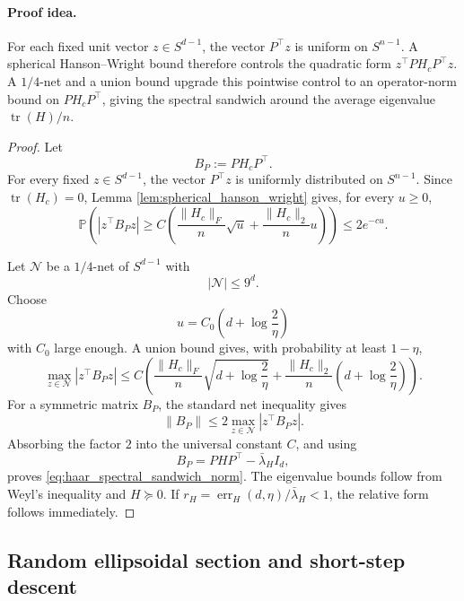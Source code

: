 \documentclass{article}
\begin{document}
\paragraph{Proof idea.}
For each fixed unit vector \(z\in S^{d-1}\), the vector \(P^\top z\) is uniform
on \(S^{n-1}\). A spherical Hanson--Wright bound therefore controls the
quadratic form \(z^\top PH_cP^\top z\). A \(1/4\)-net and a union bound upgrade
this pointwise control to an operator-norm bound on \(PH_cP^\top\), giving the
spectral sandwich around the average eigenvalue \(\operatorname{tr}(H)/n\).
\begin{proof}
Let
\[
B_P:=PH_cP^\top.
\]
For every fixed \(z\in S^{d-1}\), the vector \(P^\top z\) is uniformly
distributed on \(S^{n-1}\). Since \(\operatorname{tr}(H_c)=0\), Lemma
\ref{lem:spherical_hanson_wright} gives, for every \(u\ge0\),
\[
\mathbb P\!\left(
|z^\top B_Pz|
\ge
C\left(
\frac{\|H_c\|_F}{n}\sqrt u
+
\frac{\|H_c\|_2}{n}u
\right)
\right)
\le
2e^{-cu}.
\]

Let \(\mathcal N\) be a \(1/4\)-net of \(S^{d-1}\) with
\[
|\mathcal N|\le 9^d.
\]
Choose
\[
u=C_0\left(d+\log\frac{2}{\eta}\right)
\]
with \(C_0\) large enough. A union bound gives, with probability at least
\(1-\eta\),
\[
\max_{z\in\mathcal N}|z^\top B_Pz|
\le
C\left(
\frac{\|H_c\|_F}{n}\sqrt{d+\log\frac{2}{\eta}}
+
\frac{\|H_c\|_2}{n}\left(d+\log\frac{2}{\eta}\right)
\right).
\]
For a symmetric matrix \(B_P\), the standard net inequality gives
\[
\|B_P\|\le2\max_{z\in\mathcal N}|z^\top B_Pz|.
\]
Absorbing the factor \(2\) into the universal constant \(C\), and using
\[
B_P=PHP^\top-\bar\lambda_HI_d,
\]
proves \eqref{eq:haar_spectral_sandwich_norm}. The eigenvalue bounds follow
from Weyl's inequality and \(H\succeq0\). If
\(r_H=\operatorname{err}_H(d,\eta)/\bar\lambda_H<1\), the relative form follows
immediately.
\end{proof}

\subsection{Random ellipsoidal section and short-step descent}
\end{document}
